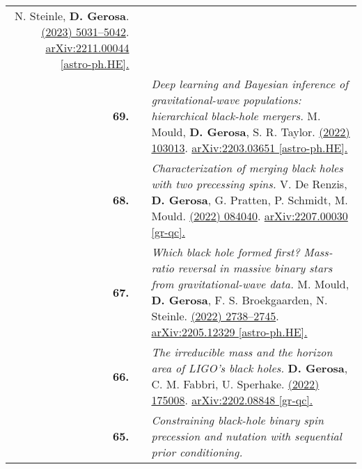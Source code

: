 {\begin{longtable}{rp{0.3cm}p{15.8cm}}
N. Steinle, \textbf{D. Gerosa}.
\newline{}
\href{https://doi.org/10.1093/mnras/stac3821}{\mnras 519 (2023) 5031–5042}. \href{https://arxiv.org/abs/2211.00044}{arXiv:2211.00044 [astro-ph.HE].}
\vspace{0.09cm}\\
%
\textbf{69.} & & \textit{Deep learning and Bayesian inference of gravitational-wave populations: hierarchical black-hole mergers.}
\newline{}
M. Mould, \textbf{D. Gerosa}, S. R. Taylor.
\newline{}
\href{https://journals.aps.org/prd/abstract/10.1103/PhysRevD.106.103013}{\prd 106 (2022) 103013}. \href{https://arxiv.org/abs/2203.03651}{arXiv:2203.03651 [astro-ph.HE].}
\vspace{0.09cm}\\
%
\textbf{68.} & & \textit{Characterization of merging black holes with two precessing spins.}
\newline{}
V. De Renzis, \textbf{D. Gerosa}, G. Pratten, P. Schmidt, M. Mould.
\newline{}
\href{https://journals.aps.org/prd/abstract/10.1103/PhysRevD.106.084040}{\prd 106 (2022) 084040}. \href{https://arxiv.org/abs/2207.00030}{arXiv:2207.00030 [gr-qc].}
\vspace{0.09cm}\\
%
\textbf{67.} & & \textit{Which black hole formed first? Mass-ratio reversal in massive binary stars from gravitational-wave data.}
\newline{}
M. Mould, \textbf{D. Gerosa}, F. S. Broekgaarden, N. Steinle.
\newline{}
\href{https://doi.org/10.1093/mnras/stac2859}{\mnras 517 (2022) 2738–2745}. \href{https://arxiv.org/abs/2205.12329}{arXiv:2205.12329 [astro-ph.HE].}
\vspace{0.09cm}\\
%
\textbf{66.} & & \textit{The irreducible mass and the horizon area of LIGO's black holes.}
\newline{}
\textbf{D. Gerosa}, C. M. Fabbri, U. Sperhake.
\newline{}
\href{https://iopscience.iop.org/article/10.1088/1361-6382/ac8332}{\cqg 39 (2022) 175008}. \href{https://arxiv.org/abs/2202.08848}{arXiv:2202.08848 [gr-qc].}
\vspace{0.09cm}\\
%
\textbf{65.} & & \textit{Constraining black-hole binary spin precession and nutation with sequential prior conditioning.}
\newline{}

\end{longtable}}
